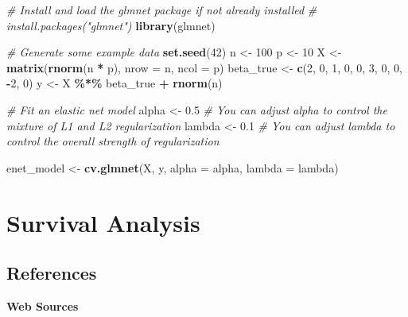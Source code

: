 \documentclass[
]{book}
\newenvironment{Shaded}{\begin{snugshade}}{\end{snugshade}}
\newcommand{\AttributeTok}[1]{\textcolor[rgb]{0.13,0.29,0.53}{#1}}
\newcommand{\CommentTok}[1]{\textcolor[rgb]{0.56,0.35,0.01}{\textit{#1}}}
\newcommand{\DecValTok}[1]{\textcolor[rgb]{0.00,0.00,0.81}{#1}}
\newcommand{\FloatTok}[1]{\textcolor[rgb]{0.00,0.00,0.81}{#1}}
\newcommand{\FunctionTok}[1]{\textcolor[rgb]{0.13,0.29,0.53}{\textbf{#1}}}
\newcommand{\NormalTok}[1]{#1}
\newcommand{\OtherTok}[1]{\textcolor[rgb]{0.56,0.35,0.01}{#1}}
\newcommand{\SpecialCharTok}[1]{\textcolor[rgb]{0.81,0.36,0.00}{\textbf{#1}}}
\begin{document}
\begin{Shaded}
\begin{Highlighting}[]
\CommentTok{\# Install and load the glmnet package if not already installed}
\CommentTok{\# install.packages("glmnet")}
\FunctionTok{library}\NormalTok{(glmnet)}

\CommentTok{\# Generate some example data}
\FunctionTok{set.seed}\NormalTok{(}\DecValTok{42}\NormalTok{)}
\NormalTok{n }\OtherTok{\textless{}{-}} \DecValTok{100}
\NormalTok{p }\OtherTok{\textless{}{-}} \DecValTok{10}
\NormalTok{X }\OtherTok{\textless{}{-}} \FunctionTok{matrix}\NormalTok{(}\FunctionTok{rnorm}\NormalTok{(n }\SpecialCharTok{*}\NormalTok{ p), }\AttributeTok{nrow =}\NormalTok{ n, }\AttributeTok{ncol =}\NormalTok{ p)}
\NormalTok{beta\_true }\OtherTok{\textless{}{-}} \FunctionTok{c}\NormalTok{(}\DecValTok{2}\NormalTok{, }\DecValTok{0}\NormalTok{, }\DecValTok{1}\NormalTok{, }\DecValTok{0}\NormalTok{, }\DecValTok{0}\NormalTok{, }\DecValTok{3}\NormalTok{, }\DecValTok{0}\NormalTok{, }\DecValTok{0}\NormalTok{, }\SpecialCharTok{{-}}\DecValTok{2}\NormalTok{, }\DecValTok{0}\NormalTok{)}
\NormalTok{y }\OtherTok{\textless{}{-}}\NormalTok{ X }\SpecialCharTok{\%*\%}\NormalTok{ beta\_true }\SpecialCharTok{+} \FunctionTok{rnorm}\NormalTok{(n)}

\CommentTok{\# Fit an elastic net model}
\NormalTok{alpha }\OtherTok{\textless{}{-}} \FloatTok{0.5}  \CommentTok{\# You can adjust alpha to control the mixture of L1 and L2 regularization}
\NormalTok{lambda }\OtherTok{\textless{}{-}} \FloatTok{0.1}  \CommentTok{\# You can adjust lambda to control the overall strength of regularization}

\NormalTok{enet\_model }\OtherTok{\textless{}{-}} \FunctionTok{cv.glmnet}\NormalTok{(X, y, }\AttributeTok{alpha =}\NormalTok{ alpha, }\AttributeTok{lambda =}\NormalTok{ lambda)}
\end{Highlighting}
\end{Shaded}

\hypertarget{survival-analysis}{%
\section{Survival Analysis}\label{survival-analysis}}

\hypertarget{references}{%
\subsection{References}\label{references}}

\textbf{Web Sources}
\end{document}
